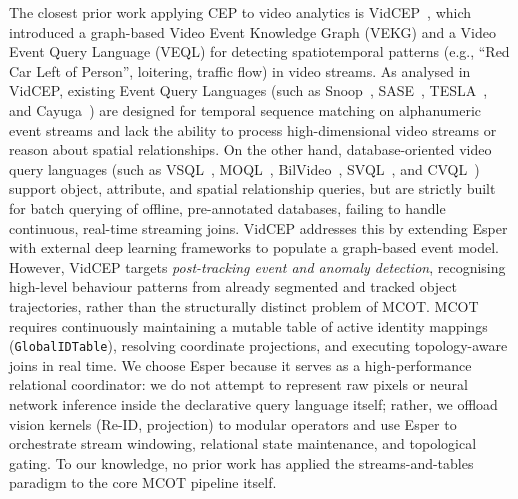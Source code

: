 \documentclass[review]{elsarticle}
\begin{document}
The closest prior work applying CEP to video analytics is VidCEP~\cite{yadav2019vidcep}, which introduced a graph-based Video Event Knowledge Graph (VEKG) and a Video Event Query Language (VEQL) for detecting spatiotemporal patterns (e.g., ``Red Car Left of Person'', loitering, traffic flow) in video streams. As analysed in VidCEP, existing Event Query Languages (such as Snoop~\cite{chakravarthy1994snoop}, SASE~\cite{wu2006sase}, TESLA~\cite{cugola2010tesla}, and Cayuga~\cite{demers2007cayuga}) are designed for temporal sequence matching on alphanumeric event streams and lack the ability to process high-dimensional video streams or reason about spatial relationships. On the other hand, database-oriented video query languages (such as VSQL~\cite{10.1145/951676.951682}, MOQL~\cite{li1997moql}, BilVideo~\cite{donderler2005bilvideo}, SVQL~\cite{lu2015svql}, and CVQL~\cite{le2008query}) support object, attribute, and spatial relationship queries, but are strictly built for batch querying of offline, pre-annotated databases, failing to handle continuous, real-time streaming joins. VidCEP addresses this by extending Esper with external deep learning frameworks to populate a graph-based event model. However, VidCEP targets \emph{post-tracking event and anomaly detection}, recognising high-level behaviour patterns from already segmented and tracked object trajectories, rather than the structurally distinct problem of MCOT. MCOT requires continuously maintaining a mutable table of active identity mappings (\texttt{GlobalIDTable}), resolving coordinate projections, and executing topology-aware joins in real time. We choose Esper because it serves as a high-performance relational coordinator: we do not attempt to represent raw pixels or neural network inference inside the declarative query language itself; rather, we offload vision kernels (Re-ID, projection) to modular operators and use Esper to orchestrate stream windowing, relational state maintenance, and topological gating. To our knowledge, no prior work has applied the streams-and-tables paradigm to the core MCOT pipeline itself.
\end{document}
